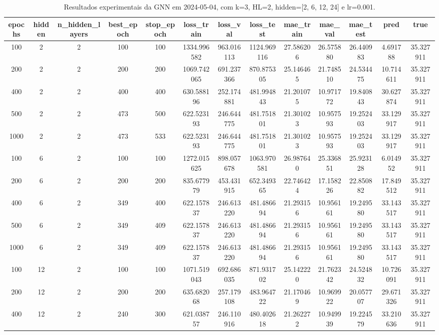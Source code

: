 \begin{table}[h]
\centering
\caption{Resultados experimentais da GNN em 2024-05-04, com k=3, HL=2, hidden=[2, 6, 12, 24] e lr=0.001.}
\label{tab:gnn_results_k3_hl2_d20240504}
\begin{tabular}{ccccccccccccc}
\toprule
epochs & hidden & n\_hidden\_layers & best\_epoch & stop\_epoch & loss\_train & loss\_val & loss\_test & mae\_train & mae\_val & mae\_test & pred & true \\
\midrule
100 & 2 & 2 & 100 & 100 & 1334.996582 & 963.016113 & 1124.969116 & 27.586206 & 26.575880 & 26.440983 & 4.691788 & 35.327911 \\
200 & 2 & 2 & 200 & 200 & 1069.742065 & 691.237366 & 870.875305 & 25.146465 & 21.748510 & 24.534475 & 10.714611 & 35.327911 \\
400 & 2 & 2 & 400 & 400 & 630.588196 & 252.174881 & 481.994843 & 21.201075 & 10.971772 & 19.840843 & 30.627874 & 35.327911 \\
500 & 2 & 2 & 473 & 500 & 622.523193 & 246.644775 & 481.751801 & 21.301023 & 10.957593 & 19.252403 & 33.129917 & 35.327911 \\
1000 & 2 & 2 & 473 & 533 & 622.523193 & 246.644775 & 481.751801 & 21.301023 & 10.957593 & 19.252403 & 33.129917 & 35.327911 \\
100 & 6 & 2 & 100 & 100 & 1272.015625 & 898.057678 & 1063.970581 & 26.987640 & 25.336851 & 25.923128 & 6.014952 & 35.327911 \\
200 & 6 & 2 & 200 & 200 & 835.677979 & 453.431915 & 652.349365 & 22.746424 & 17.158226 & 22.850882 & 17.849512 & 35.327911 \\
400 & 6 & 2 & 349 & 400 & 622.157837 & 246.613220 & 481.486694 & 21.293156 & 10.956161 & 19.249580 & 33.143517 & 35.327911 \\
500 & 6 & 2 & 349 & 409 & 622.157837 & 246.613220 & 481.486694 & 21.293156 & 10.956161 & 19.249580 & 33.143517 & 35.327911 \\
1000 & 6 & 2 & 349 & 409 & 622.157837 & 246.613220 & 481.486694 & 21.293156 & 10.956161 & 19.249580 & 33.143517 & 35.327911 \\
100 & 12 & 2 & 100 & 100 & 1071.519043 & 692.686035 & 871.931702 & 25.142220 & 21.762342 & 24.524832 & 10.726091 & 35.327911 \\
200 & 12 & 2 & 200 & 200 & 635.682068 & 257.179108 & 483.964722 & 21.170469 & 10.969922 & 20.057707 & 29.671326 & 35.327911 \\
400 & 12 & 2 & 240 & 300 & 621.038757 & 246.110916 & 480.402618 & 21.262272 & 10.949939 & 19.224579 & 33.210636 & 35.327911 \\

\end{tabular}
\end{table}
